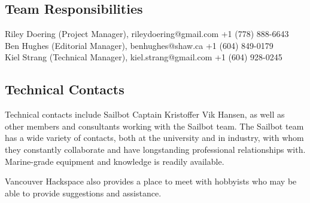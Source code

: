 \subsection{\label{sec:responsibilities:team}Team Responsibilities}
Riley Doering (Project Manager), rileydoering@gmail.com +1 (778) 888-6643\\
Ben Hughes (Editorial Manager), benhughes@shaw.ca +1 (604) 849-0179\\
Kiel Strang (Technical Manager), kiel.strang@gmail.com +1 (604) 928-0245\\

\subsection{\label{sec:responsibilities:technical-contacts}Technical Contacts}
Technical contacts include Sailbot Captain Kristoffer Vik Hansen, as well as other members and consultants working with the Sailbot team. The Sailbot team has a wide variety of contacts, both at the university and in industry, with whom they constantly collaborate and have longstanding professional relationships with. Marine-grade equipment and knowledge is readily available.

Vancouver Hackspace also provides a place to meet with hobbyists who may be able to provide suggestions and assistance.
